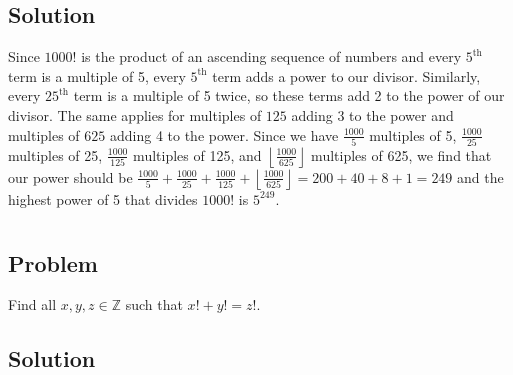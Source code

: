 \documentclass[12pt]{article}
\newcommand{\floor}[1]{\left\lfloor #1 \right\rfloor}
\newcommand{\Z}    [0]{\mathbb{Z}                   }
\begin{document}
\subsection{Solution}
Since $1000!$ is the product of an ascending sequence of numbers and every $5^\text{th}$ term is a multiple of 5, every $5^\text{th}$ term adds a power to our divisor. Similarly, every $25^\text{th}$ term is a multiple of 5 twice, so these terms add 2 to the power of our divisor. The same applies for multiples of $125$ adding 3 to the power and multiples of $625$ adding 4 to the power. Since we have $\frac{1000}{5}$ multiples of 5, $\frac{1000}{25}$ multiples of 25, $\frac{1000}{125}$ multiples of 125, and $\floor{\frac{1000}{625}}$ multiples of 625, we find that our power should be $\frac{1000}{5} + \frac{1000}{25} + \frac{1000}{125} + \floor{\frac{1000}{625}} = 200 + 40 + 8 + 1 = 249$ and the highest power of 5 that divides $1000!$ is $\boxed{5^{249}}$.



\section{}

\subsection{Problem}
Find all $x, y, z \in \Z$ such that $x! + y! = z!$.

\subsection{Solution}
\end{document}
